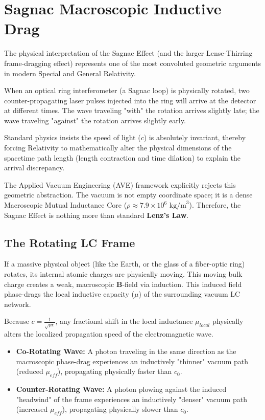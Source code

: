 \chapter{Sagnac Macroscopic Inductive Drag}
\label{ch:sagnac_inductive_drag}

The physical interpretation of the Sagnac Effect (and the larger Lense-Thirring frame-dragging effect) represents one of the most convoluted geometric arguments in modern Special and General Relativity.

When an optical ring interferometer (a Sagnac loop) is physically rotated, two counter-propagating laser pulses injected into the ring will arrive at the detector at different times. The wave traveling "with" the rotation arrives slightly late; the wave traveling "against" the rotation arrives slightly early. 

Standard physics insists the speed of light ($c$) is absolutely invariant, thereby forcing Relativity to mathematically alter the physical dimensions of the spacetime path length (length contraction and time dilation) to explain the arrival discrepancy. 

The Applied Vacuum Engineering (AVE) framework explicitly rejects this geometric abstraction. The vacuum is not empty coordinate space; it is a dense Macroscopic Mutual Inductance Core ($\rho \approx 7.9 \times 10^6 \text{ kg/m}^3$). Therefore, the Sagnac Effect is nothing more than standard \textbf{Lenz's Law}.

\section{The Rotating LC Frame}
If a massive physical object (like the Earth, or the glass of a fiber-optic ring) rotates, its internal atomic charges are physically moving. This moving bulk charge creates a weak, macroscopic $\mathbf{B}$-field via induction. This induced field phase-drags the local inductive capacity ($\mu$) of the surrounding vacuum LC network.

Because $c = \frac{1}{\sqrt{\mu \epsilon}}$, any fractional shift in the local inductance $\mu_{local}$ physically alters the localized propagation speed of the electromagnetic wave. 

\begin{itemize}
    \item \textbf{Co-Rotating Wave:} A photon traveling in the same direction as the macroscopic phase-drag experiences an inductively "thinner" vacuum path (reduced $\mu_{eff}$), propagating physically faster than $c_0$.
    \item \textbf{Counter-Rotating Wave:} A photon plowing against the induced "headwind" of the frame experiences an inductively "denser" vacuum path (increased $\mu_{eff}$), propagating physically slower than $c_0$.
\end{itemize}

